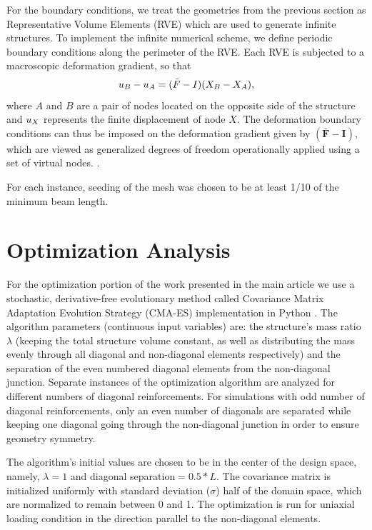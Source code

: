 \documentclass[10pt,twoside]{fernandes_supp}
\begin{document}
For the boundary conditions, we treat the geometries from the previous section as Representative Volume Elements (RVE) which are used to generate infinite structures. To implement the infinite numerical scheme, we define periodic boundary conditions along the perimeter of the RVE. Each RVE is subjected to a macroscopic deformation gradient, so that 
\begin{equation}
	\boldmath u_B-u_A=(\bar{F}-I)(X_B-X_A),
\end{equation}
where $A$ and $B$ are a pair of nodes located on the opposite side of the structure and $\boldmath u_X$ represents the finite displacement of node $X$. The deformation boundary conditions can thus be imposed on the deformation gradient given by $(\mathbold{\bar{F}-I})$, which are viewed as generalized degrees of freedom operationally applied using a set of virtual nodes. \citep{danielson2002}.

For each instance, seeding of the mesh was chosen to be at least 1/10 of the minimum beam length. 

\section{Optimization Analysis}
For the optimization portion of the work presented in the main article we use a stochastic, derivative-free evolutionary method called Covariance Matrix Adaptation Evolution Strategy (CMA-ES) implementation in Python \citep{hansen2003}. The algorithm parameters (continuous input variables) are: the structure's mass ratio $\lambda$ (keeping the total structure volume constant, as well as distributing the mass evenly through all diagonal and non-diagonal elements respectively) and the separation of the even numbered diagonal elements from the non-diagonal junction. Separate instances of the optimization algorithm are analyzed for different numbers of diagonal reinforcements. For simulations with odd number of diagonal reinforcements, only an even number of diagonals are separated while keeping one diagonal going through the non-diagonal junction in order to ensure geometry symmetry. 

The algorithm's initial values are chosen to be in the center of the design space, namely, $\lambda=1$ and diagonal separation$=0.5*L$. The covariance matrix is initialized uniformly with standard deviation ($\sigma$) half of the domain space, which are normalized to remain between 0 and 1. The optimization is run for uniaxial loading condition in the direction parallel to the non-diagonal elements. 
\end{document}
